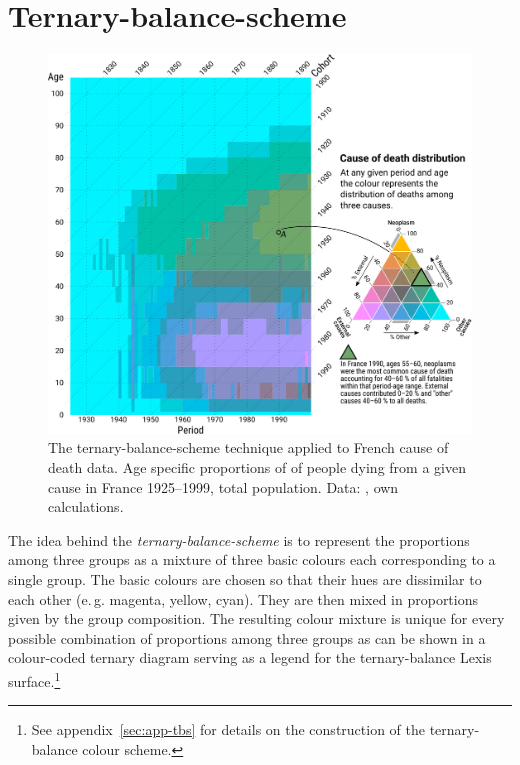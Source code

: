 \documentclass[parskip=half]{scrartcl}
\begin{document}
\section{Ternary-balance-scheme} %
\label{sec:tbs}

\begin{figure}[!htb]
  \centering
  \includegraphics[width = \textwidth]{./fig/tern_balance.pdf}
  \caption{The ternary-balance-scheme technique applied to French cause of death data. Age specific proportions of of people dying from a given cause in France 1925--1999, total population. Data: \cite{Vallin2014}, own calculations.}
  \label{fig:tbs}
\end{figure}

The idea behind the \emph{ternary-balance-scheme} is to represent the proportions among three groups as a mixture of three basic colours each corresponding to a single group. The basic colours are chosen so that their hues are dissimilar to each other (e.\,g. magenta, yellow, cyan). They are then mixed in proportions given by the group composition. The resulting colour mixture is unique for every possible combination of proportions among three groups as can be shown in a colour-coded ternary diagram serving as a legend for the ternary-balance Lexis surface.\footnote{See appendix~\ref{sec:app-tbs} for details on the construction of the ternary-balance colour scheme.}
\end{document}
